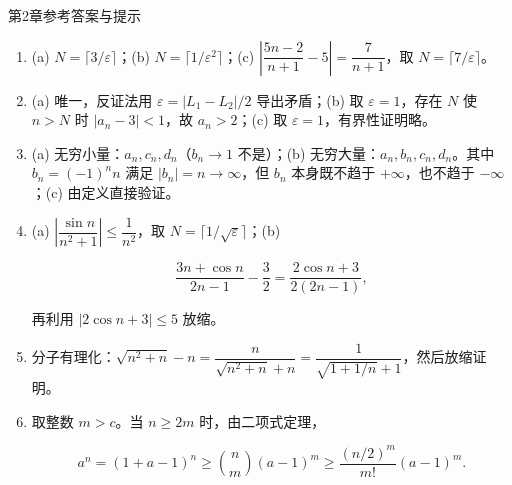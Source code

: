 \documentclass[aspectratio=169,10pt,fontset=fandol]{ctexbeamer}
\begin{document}
\begin{frame}[t,fragile]{第2章参考答案与提示}
\normalsize
{\normalsize
\begin{enumerate}

\item[(1)] 

   (a) \(N = \lceil 3/\varepsilon \rceil\)；(b) \(N = \lceil 1/\varepsilon^2 \rceil\)；(c) \(\left|\dfrac{5n-2}{n+1} - 5\right| = \dfrac{7}{n+1}\)，取 \(N = \lceil 7/\varepsilon \rceil\)。



\item[(2)] 

   (a) 唯一，反证法用 \(\varepsilon = |L_1 - L_2|/2\) 导出矛盾；(b) 取 \(\varepsilon = 1\)，存在 \(N\) 使 \(n > N\) 时 \(|a_n-3|<1\)，故 \(a_n > 2\)；(c) 取 \(\varepsilon=1\)，有界性证明略。



\item[(3)] 

   (a) 无穷小量：\(a_n, c_n, d_n\)（\(b_n \to 1\) 不是）；(b) 无穷大量：\(a_n,b_n,c_n,d_n\)。其中 \(b_n=(-1)^n n\) 满足 \(|b_n|=n\to\infty\)，但 \(b_n\) 本身既不趋于 \(+\infty\)，也不趋于 \(-\infty\)；(c) 由定义直接验证。



\item[(4)] 

   (a) \(\left|\dfrac{\sin n}{n^2+1}\right| \leq \dfrac{1}{n^2}\)，取 \(N = \lceil 1/\sqrt{\varepsilon} \rceil\)；(b)

   \[

   \frac{3n+\cos n}{2n-1}-\frac32

   =\frac{2\cos n+3}{2(2n-1)},

   \]

   再利用 \(|2\cos n+3|\leq5\) 放缩。



\item[(5)] 

   分子有理化：\(\sqrt{n^2+n} - n = \dfrac{n}{\sqrt{n^2+n}+n} = \dfrac{1}{\sqrt{1+1/n}+1}\)，然后放缩证明。



\item[(6)] 

   取整数 \(m>c\)。当 \(n\geq2m\) 时，由二项式定理，

   \[

   a^n=(1+a-1)^n\geq\binom{n}{m}(a-1)^m

   \geq\frac{(n/2)^m}{m!}(a-1)^m.

\]
\end{enumerate}}
\end{frame}
\end{document}
